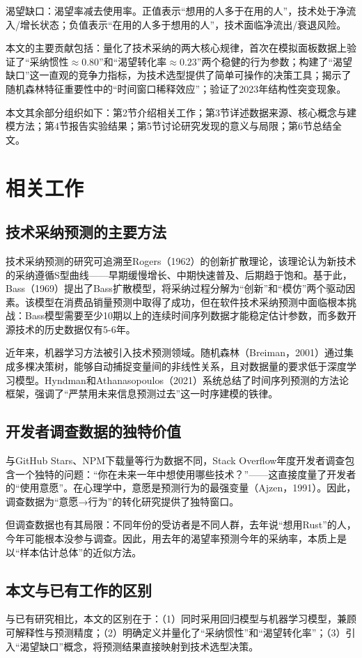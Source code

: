 \documentclass[fontset=windows]{cjc}
\begin{document}
渴望缺口：渴望率减去使用率。正值表示“想用的人多于在用的人”，技术处于净流入/增长状态；负值表示“在用的人多于想用的人”，技术面临净流出/衰退风险。

本文的主要贡献包括：量化了技术采纳的两大核心规律，首次在模拟面板数据上验证了“采纳惯性$\approx0.80$”和“渴望转化率$\approx0.23$”两个稳健的行为参数；构建了“渴望缺口”这一直观的竞争力指标，为技术选型提供了简单可操作的决策工具；揭示了随机森林特征重要性中的“时间窗口稀释效应”；验证了2023年结构性突变现象。

本文其余部分组织如下：第2节介绍相关工作；第3节详述数据来源、核心概念与建模方法；第4节报告实验结果；第5节讨论研究发现的意义与局限；第6节总结全文。

\section{相关工作}
\subsection{技术采纳预测的主要方法}
技术采纳预测的研究可追溯至Rogers（1962）的创新扩散理论，该理论认为新技术的采纳遵循S型曲线——早期缓慢增长、中期快速普及、后期趋于饱和。基于此，Bass（1969）提出了Bass扩散模型，将采纳过程分解为“创新”和“模仿”两个驱动因素。该模型在消费品销量预测中取得了成功，但在软件技术采纳预测中面临根本挑战：Bass模型需要至少10期以上的连续时间序列数据才能稳定估计参数，而多数开源技术的历史数据仅有5-6年。

近年来，机器学习方法被引入技术预测领域。随机森林（Breiman，2001）通过集成多棵决策树，能够自动捕捉变量间的非线性关系，且对数据量的要求低于深度学习模型。Hyndman和Athanasopoulos（2021）系统总结了时间序列预测的方法论框架，强调了“严禁用未来信息预测过去”这一时序建模的铁律。

\subsection{开发者调查数据的独特价值}
与GitHub Stars、NPM下载量等行为数据不同，Stack Overflow年度开发者调查包含一个独特的问题：“你在未来一年中想使用哪些技术？”——这直接度量了开发者的“使用意愿”。在心理学中，意愿是预测行为的最强变量（Ajzen，1991）。因此，调查数据为“意愿→行为”的转化研究提供了独特窗口。

但调查数据也有其局限：不同年份的受访者是不同人群，去年说“想用Rust”的人，今年可能根本没参与调查。因此，用去年的渴望率预测今年的采纳率，本质上是以“样本估计总体”的近似方法。

\subsection{本文与已有工作的区别}
与已有研究相比，本文的区别在于：（1）同时采用回归模型与机器学习模型，兼顾可解释性与预测精度；（2）明确定义并量化了“采纳惯性”和“渴望转化率”；（3）引入“渴望缺口”概念，将预测结果直接映射到技术选型决策。
\end{document}
